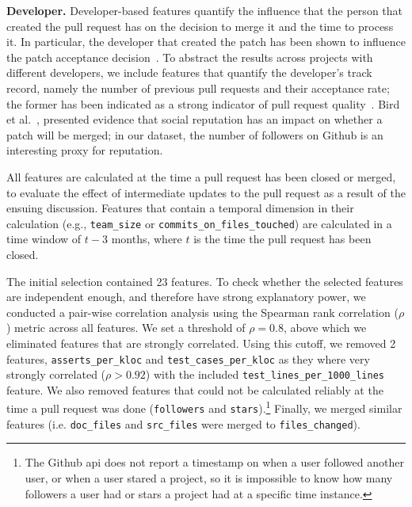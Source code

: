 \documentclass{acm_proc_article-sp}
\begin{document}
  \textbf{Developer.}  
    Developer-based features quantify the influence that the person that
    created the pull request has on the decision to merge it and
    the time to process it. In particular, the developer that created the patch
    has been shown to influence the patch acceptance decision~\cite{Jeong09}. To
    abstract the results across projects with different developers, we
    include features that quantify the developer's track record, namely the
    number of previous pull requests and their acceptance rate; the former has
    been indicated as a strong indicator of pull request quality~\cite{Pham13}.
    Bird et al.~\cite{Bird07}, presented evidence that social
    reputation has an impact on whether a patch will be merged; in our dataset,
    the number of followers on Github is an interesting proxy for
    reputation.

All features are calculated at the time a pull request has been closed or
merged, to evaluate the effect of intermediate updates to the pull request as a
result of the ensuing discussion. Features that contain a temporal dimension in
their calculation (e.g., \texttt{team\_size} or
\texttt{commits\_on\_files\_touched}) are calculated in a time window of $t - 3$
months, where $t$ is the time the pull request has been closed. 

The initial selection contained 23 features. To check whe\-ther the selected
features are independent enough, and therefore have strong explanatory power, we
conducted a pair-wise correlation analysis using the Spearman rank correlation
($\rho$) metric across all features. We set a threshold of $\rho = 0.8$, above
which we eliminated features that are strongly correlated. Using this cutoff, we
removed 2 features, \texttt{asserts\_per\_kloc} and
\texttt{test\_cases\_per\_kloc} as they where very strongly correlated ($\rho >
0.92$) with the included \texttt{test\_lines\_per\_1000\_lines} feature. We also
removed features that could not be calculated reliably at the time a pull
request was done (\texttt{followers} and \texttt{stars}).\footnote{The Github
{\sc api} does not report a timestamp on when a user followed another user, or
when a user stared a project, so it is impossible to know how many followers a
user had or stars a project had at a specific time instance.} Finally, we
merged similar features (i.e. \texttt{doc\_files} and \texttt{src\_files} were merged to \texttt{files\_changed}). 
\end{document}
